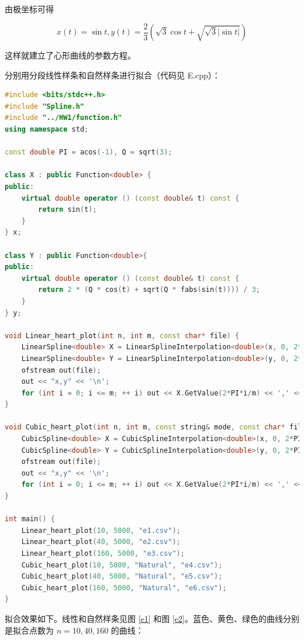 \documentclass{ctexart}
\begin{document}
由极坐标可得

\begin{equation}
    x(t)=\sin t,y(t)=\dfrac 23(\sqrt 3\cos t+\sqrt{\sqrt 3|\sin t|})
\end{equation}

这样就建立了心形曲线的参数方程。

分别用分段线性样条和自然样条进行拟合（代码见 E.cpp）：

\begin{lstlisting}[language={c++}]
#include <bits/stdc++.h>
#include "Spline.h"
#include "../HW1/function.h"
using namespace std;

const double PI = acos(-1), Q = sqrt(3);

class X : public Function<double> {
public:
	virtual double operator () (const double& t) const {
		return sin(t);
	}
} x;

class Y : public Function<double>{
public:
	virtual double operator () (const double& t) const {
		return 2 * (Q * cos(t) + sqrt(Q * fabs(sin(t)))) / 3;
	}
} y;

void Linear_heart_plot(int n, int m, const char* file) {
	LinearSpline<double> X = LinearSplineInterpolation<double>(x, 0, 2*PI, n);
	LinearSpline<double> Y = LinearSplineInterpolation<double>(y, 0, 2*PI, n);
	ofstream out(file);
	out << "x,y" << '\n';
	for (int i = 0; i <= m; ++ i) out << X.GetValue(2*PI*i/m) << ',' << Y.GetValue(2*PI*i/m) << '\n';
}

void Cubic_heart_plot(int n, int m, const string& mode, const char* file) {
	CubicSpline<double> X = CubicSplineInterpolation<double>(x, 0, 2*PI, n, mode);
	CubicSpline<double> Y = CubicSplineInterpolation<double>(y, 0, 2*PI, n, mode);
	ofstream out(file);
	out << "x,y" << '\n';
	for (int i = 0; i <= m; ++ i) out << X.GetValue(2*PI*i/m) << ',' << Y.GetValue(2*PI*i/m) << '\n';
}

int main() {
	Linear_heart_plot(10, 5000, "e1.csv");
	Linear_heart_plot(40, 5000, "e2.csv");
	Linear_heart_plot(160, 5000, "e3.csv");
	Cubic_heart_plot(10, 5000, "Natural", "e4.csv");
	Cubic_heart_plot(40, 5000, "Natural", "e5.csv");
	Cubic_heart_plot(160, 5000, "Natural", "e6.csv");
}
\end{lstlisting}

拟合效果如下。线性和自然样条见图 \ref{e1} 和图 \ref{e2}。蓝色、黄色、绿色的曲线分别是拟合点数为 $n=10,40,160$ 的曲线：
\end{document}
